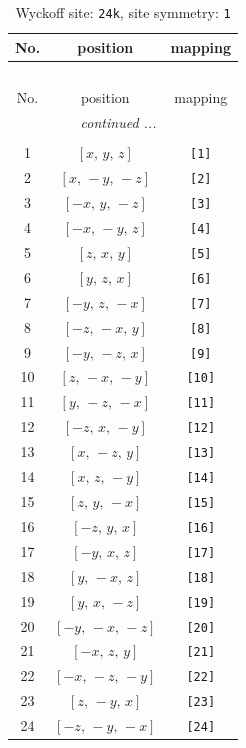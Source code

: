\documentclass[fleqn,8pt]{jsarticle}
\begin{document}
\begin{longtable}{ccc}
\caption{Wyckoff site: {\tt 24k}, site symmetry: {\tt 1}}
 \\
 \hline \hline
No. & position & mapping \\ \hline \endfirsthead

\multicolumn{2}{l}{\tablename\ \thetable{}} \\
 \hline \hline
No. & position & mapping \\ \hline \endhead

 \hline \hline
\multicolumn{2}{r}{\footnotesize\it continued ...} \\ \endfoot

 \hline \hline
\multicolumn{2}{r}{} \\ \endlastfoot

1 & $\left[ x,\, y,\, z \right]$ & {\tt [1]} \\ \hline
2 & $\left[ x,\, - y,\, - z \right]$ & {\tt [2]} \\ \hline
3 & $\left[ - x,\, y,\, - z \right]$ & {\tt [3]} \\ \hline
4 & $\left[ - x,\, - y,\, z \right]$ & {\tt [4]} \\ \hline
5 & $\left[ z,\, x,\, y \right]$ & {\tt [5]} \\ \hline
6 & $\left[ y,\, z,\, x \right]$ & {\tt [6]} \\ \hline
7 & $\left[ - y,\, z,\, - x \right]$ & {\tt [7]} \\ \hline
8 & $\left[ - z,\, - x,\, y \right]$ & {\tt [8]} \\ \hline
9 & $\left[ - y,\, - z,\, x \right]$ & {\tt [9]} \\ \hline
10 & $\left[ z,\, - x,\, - y \right]$ & {\tt [10]} \\ \hline
11 & $\left[ y,\, - z,\, - x \right]$ & {\tt [11]} \\ \hline
12 & $\left[ - z,\, x,\, - y \right]$ & {\tt [12]} \\ \hline
13 & $\left[ x,\, - z,\, y \right]$ & {\tt [13]} \\ \hline
14 & $\left[ x,\, z,\, - y \right]$ & {\tt [14]} \\ \hline
15 & $\left[ z,\, y,\, - x \right]$ & {\tt [15]} \\ \hline
16 & $\left[ - z,\, y,\, x \right]$ & {\tt [16]} \\ \hline
17 & $\left[ - y,\, x,\, z \right]$ & {\tt [17]} \\ \hline
18 & $\left[ y,\, - x,\, z \right]$ & {\tt [18]} \\ \hline
19 & $\left[ y,\, x,\, - z \right]$ & {\tt [19]} \\ \hline
20 & $\left[ - y,\, - x,\, - z \right]$ & {\tt [20]} \\ \hline
21 & $\left[ - x,\, z,\, y \right]$ & {\tt [21]} \\ \hline
22 & $\left[ - x,\, - z,\, - y \right]$ & {\tt [22]} \\ \hline
23 & $\left[ z,\, - y,\, x \right]$ & {\tt [23]} \\ \hline
24 & $\left[ - z,\, - y,\, - x \right]$ & {\tt [24]} \\
\end{longtable}
\end{document}
